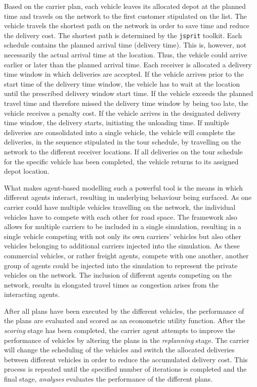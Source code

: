 Based on the carrier plan, each vehicle leaves its allocated depot at the planned time and travels on the network to the first customer stipulated on the list. The vehicle travels the shortest path on the network in order to save time and reduce the delivery cost. The shortest path is determined by the \texttt{jsprit} toolkit. Each schedule contains the planned arrival time (delivery time). This is, however, not necessarily the actual arrival time at the location. Thus, the vehicle could arrive earlier or later than the planned arrival time. Each receiver is allocated a delivery time window in which deliveries are accepted. If the vehicle arrives prior to the start time of the delivery time window, the vehicle has to wait at the location until the prescribed delivery window start time. If the vehicle exceeds the planned travel time and therefore missed the delivery time window by being too late, the vehicle receives a penalty cost. If the vehicle arrives in the designated delivery time window, the delivery starts, initiating the unloading time. If multiple deliveries are consolidated into a single vehicle, the vehicle will complete the deliveries, in the sequence stipulated in the tour schedule, by travelling on the network to the different receiver locations. If all deliveries on the tour schedule for the specific vehicle has been completed, the vehicle returns to its assigned depot location. \par

What makes agent-based modelling such a powerful tool is the means in which different agents interact, resulting in underlying behaviour being surfaced. As one carrier could have multiple vehicles travelling on the network, the individual vehicles have to compete with each other for road space. The framework also allows for multiple carriers to be included in a single simulation, resulting in a single vehicle competing with not only its own carriers' vehicles but also other vehicles belonging to additional carriers injected into the simulation. As these commercial vehicles, or rather freight agents, compete with one another, another group of agents could be injected into the simulation to represent the private vehicles on the network. The inclusion of different agents competing on the network, results in elongated travel times as congestion arises from the interacting agents. \par

After all plans have been executed by the different vehicles, the performance of the plans are evaluated and scored as an econometric utility function. After the \textit{scoring} stage has been completed, the carrier agent attempts to improve the performance of vehicles by altering the plans in the \textit{replanning} stage. The carrier will change the scheduling of the vehicles and switch the allocated deliveries between different vehicles in order to reduce the accumulated delivery cost. This process is repeated until the specified number of iterations is completed and the final stage, \textit{analyses} evaluates the performance of the different plans.

